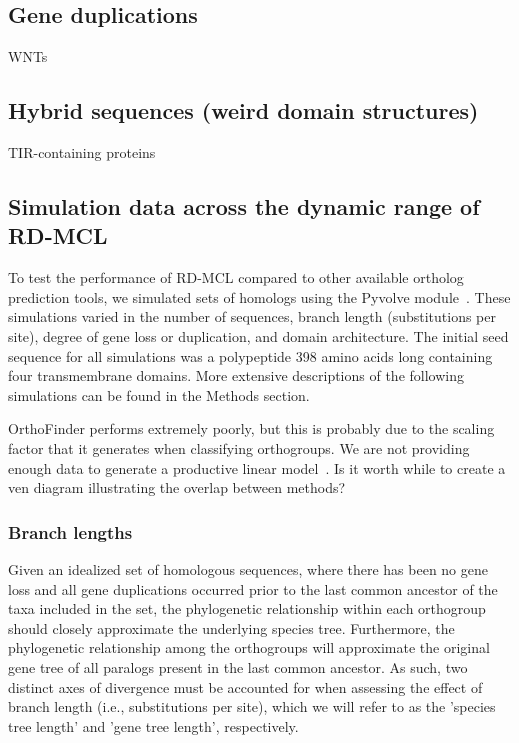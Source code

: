 \documentclass[twocolumn]{bmcart}  %
\begin{document}
\subsection{Gene duplications}
WNTs


\subsection{Hybrid sequences (weird domain structures)}
TIR-containing proteins


\subsection{Simulation data across the dynamic range of RD-MCL}\label{subsec:simulationDataAcrossTheDynamicRangeOfRd-mcl}
To test the performance of RD-MCL compared to other available ortholog prediction tools, we simulated sets of homologs using the Pyvolve module~\cite{Spielman:2015kv}.
These simulations varied in the number of sequences, branch length (substitutions per site), degree of gene loss or duplication, and domain architecture.
The initial seed sequence for all simulations was a polypeptide 398 amino acids long containing four transmembrane domains.
More extensive descriptions of the following simulations can be found in the Methods section.

OrthoFinder performs extremely poorly, but this is probably due to the scaling factor that it generates when classifying orthogroups.
We are not providing enough data to generate a productive linear model~\cite{Emms:2015ig}.
Is it worth while to create a ven diagram illustrating the overlap between methods?


\subsubsection{Branch lengths}
Given an idealized set of homologous sequences, where there has been no gene loss and all gene duplications occurred prior to the last common ancestor of the taxa included in the set, the phylogenetic relationship within each orthogroup should closely approximate the underlying species tree.
Furthermore, the phylogenetic relationship among the orthogroups will approximate the original gene tree of all paralogs present in the last common ancestor.
As such, two distinct axes of divergence must be accounted for when assessing the effect of branch length (i.e., substitutions per site), which we will refer to as the 'species tree length' and 'gene tree length', respectively.
\end{document}
